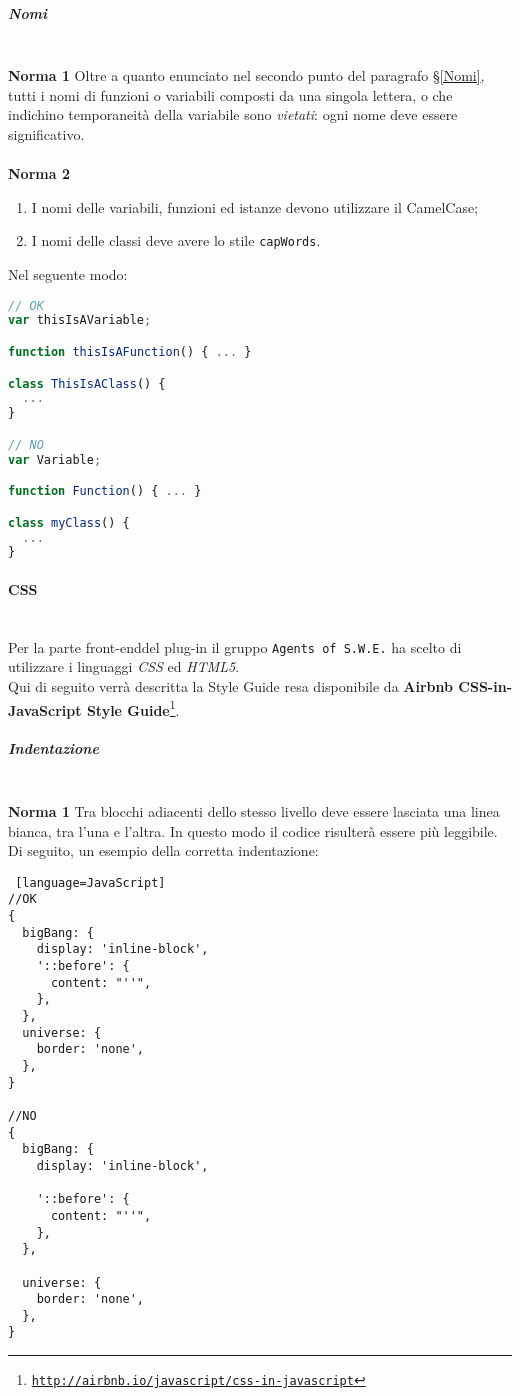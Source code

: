 \subparagraph{Nomi}\-\\
\textbf{Norma 1} Oltre a quanto enunciato nel secondo punto del paragrafo §\ref{Nomi}, tutti i nomi di funzioni o variabili composti da una singola lettera, o che indichino temporaneità della variabile sono \textit{vietati}: ogni nome deve essere significativo.\\
\-\\
\textbf{Norma 2} 
\begin{enumerate}
	\item I nomi delle variabili, funzioni ed istanze devono utilizzare il CamelCase;
	\item I nomi delle classi deve avere lo stile \texttt{capWords}.
\end{enumerate}
Nel seguente modo:
\begin{lstlisting}[language=JavaScript]
// OK
var thisIsAVariable;

function thisIsAFunction() { ... }

class ThisIsAClass() {
  ...
}

// NO
var Variable;

function Function() { ... }

class myClass() {
  ...
}
\end{lstlisting}

\paragraph{CSS}
\label{css} \-\\

Per la parte front-end\glossario del plug-in il gruppo \texttt{Agents of S.W.E.} ha scelto di utilizzare i linguaggi \textit{CSS} ed \textit{HTML5}.\\
Qui di seguito verrà descritta la Style Guide resa disponibile da \textbf{Airbnb CSS-in-JavaScript Style Guide}\footnote{\texttt{\url{http://airbnb.io/javascript/css-in-javascript}}}.

\subparagraph{Indentazione} \-\\
\textbf{Norma 1}
Tra blocchi adiacenti dello stesso livello deve essere lasciata una linea bianca, tra l'una e l'altra. In questo modo il codice risulterà essere più leggibile. \\
Di seguito, un esempio della corretta indentazione: 


\begin{lstlisting} [language=JavaScript]
//OK
{
  bigBang: {
    display: 'inline-block',
    '::before': {
      content: "''",
    },
  },
  universe: {
    border: 'none',
  },
}

//NO
{
  bigBang: {
    display: 'inline-block',

    '::before': {
      content: "''",
    },
  },

  universe: {
    border: 'none',
  },
}
\end{lstlisting}

